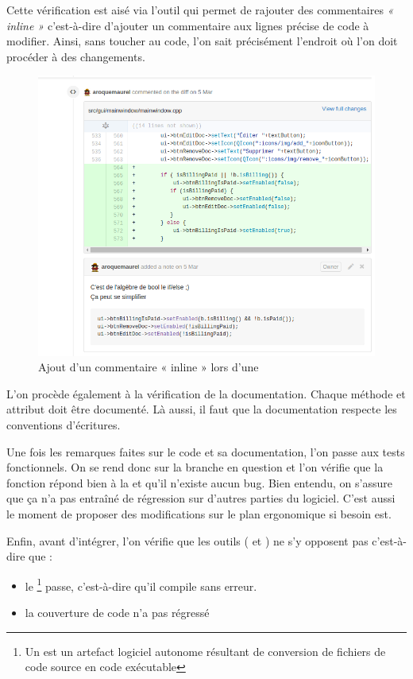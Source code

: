 Cette vérification est aisé via l'outil \Github{} qui permet de rajouter des commentaires \textit{« inline »} c'est-à-dire d'ajouter un commentaire aux lignes précise de code à modifier. Ainsi, sans toucher au code, l'on sait précisément l'endroit où l'on doit procéder à des changements. 
\begin{figure}[H]
	\centering
	\includegraphics[width=0.7\linewidth]{screens/comments_inline}
	\caption{Ajout d'un commentaire « inline » lors d'une \PullRequest}
	\label{fig:comments_inline}
\end{figure}

L'on procède également à la vérification de la documentation. Chaque méthode et attribut doit être documenté. Là aussi, il faut que la documentation respecte les conventions d'écritures. 

Une fois les remarques faites sur le code et sa documentation, l'on passe aux tests fonctionnels. On se rend donc sur la branche \Git{} en question et l'on vérifie que la fonction répond bien à la \UserStory{} et qu'il n'existe aucun bug. Bien entendu, on s'assure que ça n'a pas entraîné de régression sur d'autres parties du logiciel. C'est aussi le moment de proposer des modifications sur le plan ergonomique si besoin est.  

Enfin, avant d'intégrer, l'on vérifie que les outils (\Travis{} et \Coveralls) ne s'y opposent pas c'est-à-dire que :
\begin{itemize}
	\item le \Build{}\footnote{Un \Build est un artefact logiciel autonome résultant de conversion de fichiers de code source en code exécutable} passe, c'est-à-dire qu'il compile sans erreur.
	\item la couverture de code n'a pas régressé 
\end{itemize}
